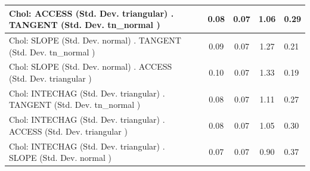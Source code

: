 \begin{table}
\begin{center}
\begin{tabular}{|l|l|c|c|c|l|}
			\hline
			 Chol: ACCESS (Std. Dev. triangular) . TANGENT (Std. Dev.   tn_normal ) &  & 0.08 & 0.07 & 1.06 & 0.29 \\
			\hline
			 Chol: SLOPE (Std. Dev. normal) . TANGENT (Std. Dev.   tn_normal ) &  & 0.09 & 0.07 & 1.27 & 0.21 \\
			\hline
			 Chol: SLOPE (Std. Dev. normal) . ACCESS (Std. Dev.   triangular ) &  & 0.10 & 0.07 & 1.33 & 0.19 \\
			\hline
			 Chol: INTECHAG (Std. Dev. triangular) . TANGENT (Std. Dev.   tn_normal ) &  & 0.08 & 0.07 & 1.11 & 0.27 \\
			\hline
			 Chol: INTECHAG (Std. Dev. triangular) . ACCESS (Std. Dev.   triangular ) &  & 0.08 & 0.07 & 1.05 & 0.30 \\
			\hline
			 Chol: INTECHAG (Std. Dev. triangular) . SLOPE (Std. Dev.   normal ) &  & 0.07 & 0.07 & 0.90 & 0.37 \\
			\hline
		\end{tabular}
	\end{center}
\end{table}